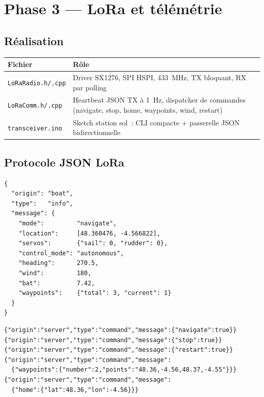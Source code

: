 \documentclass[12pt,a4paper]{article}
\newcommand{\file}[1]{\texttt{#1}}
\begin{document}
\section{Phase 3 — LoRa et télémétrie}

\subsection{Réalisation}

\begin{longtable}{L{4.5cm} L{8.5cm}}
  \toprule
  \textcolor{tableheadfg}{\textbf{Fichier}} &
  \textcolor{tableheadfg}{\textbf{Rôle}} \\
  \midrule
  \endhead
  \bottomrule
  \endfoot
  \file{LoRaRadio.h/.cpp} & Driver SX1276, SPI HSPI, 433~MHz,
                            TX bloquant, RX par polling \\[3pt]
  \file{LoRaComm.h/.cpp} & Heartbeat JSON TX à 1~Hz, dispatcher de commandes
                           (navigate, stop, home, waypoints, wind, restart) \\[3pt]
  \file{transceiver.ino} & Sketch station sol~: CLI compacte + passerelle
                           JSON bidirectionnelle \\
\end{longtable}

\subsection{Protocole JSON LoRa}

\begin{lstlisting}[style=json, caption={Heartbeat drone vers station sol (p\'eriode 1 s)}]
{
  "origin": "boat",
  "type":   "info",
  "message": {
    "mode":         "navigate",
    "location":     [48.360476, -4.566822],
    "servos":       {"sail": 0, "rudder": 0},
    "control_mode": "autonomous",
    "heading":      270.5,
    "wind":         180,
    "bat":          7.42,
    "waypoints":    {"total": 3, "current": 1}
  }
}
\end{lstlisting}

\begin{lstlisting}[style=json, caption={Commandes station sol vers drone}]
{"origin":"server","type":"command","message":{"navigate":true}}
{"origin":"server","type":"command","message":{"stop":true}}
{"origin":"server","type":"command","message":{"restart":true}}
{"origin":"server","type":"command","message":
  {"waypoints":{"number":2,"points":"48.36,-4.56,48.37,-4.55"}}}
{"origin":"server","type":"command","message":
  {"home":{"lat":48.36,"lon":-4.56}}}
\end{lstlisting}
\end{document}
